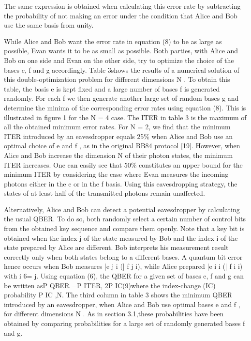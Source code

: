 The same expression is obtained when calculating this error rate by subtracting the probability of not making an error under the condition that Alice and Bob use the same basis from unity.

While Alice and Bob want the error rate in equation (8) to be as large as possible, Evan wants it to be as small as possible. Both parties, with Alice and Bob on one side and Evan on the other side, try to optimize the choice of the bases e, f and g accordingly. Table 3shows the results of a numerical solution of this double-optimization problem for different dimensions N . To obtain this table, the basis e is kept fixed and a large number of bases f is generated randomly. For each f we then generate another large set of random bases g and determine the minima of the corresponding error rates using equation (8). This is illustrated in figure 1 for the N = 4 case. The ITER in table 3 is the maximum of all the obtained minimum error rates.
For N = 2, we find that the minimum ITER introduced by an eavesdropper equals 25\% when Alice and Bob use an optimal choice of e and f , as in the original BB84 protocol [19]. However, when Alice and Bob increase the dimension N of their photon states, the minimum ITER increases. One can easily see that 50\% constitutes an upper bound for the minimum ITER by considering the case where Evan measures the incoming photons either in the e or in the f basis. Using this eavesdropping strategy, the states of at least half of the transmitted photons remain unaffected.

Alternatively, Alice and Bob can detect a potential eavesdropper by calculating the usual QBER. To do so, both randomly select a certain number of control bits from the obtained key sequence and compare them openly. Note that a key bit is obtained when the index j of the state measured by Bob and the index i of the state prepared by Alice are different. Bob interprets his measurement result correctly only when both states belong to a different bases. A quantum bit error hence occurs when Bob measures |e j i (| f j i), while Alice prepared |e i i (| f i i) with i 6= j. Using equation (6), the QBER for a given set of bases e, f and g can be written asP QBER =P ITER,
2P IC(9)where the index-change (IC) probability P IC ,N. The third column in table 3 shows the minimum QBER introduced by an eavesdropper, when Alice and Bob use optimal bases e and f , for different dimensions N . As in section 3.1,these probabilities have been obtained by comparing probabilities for a large set of randomly generated bases f and g.

